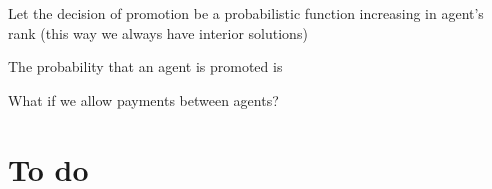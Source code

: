 \documentclass[11pt]{article}
\theoremstyle{quest}
\begin{document}


Let the decision of promotion be a probabilistic function increasing in agent's rank (this way we always have interior solutions)

The probability that an agent is promoted is 

What if we allow payments between agents?



\section{To do}
\end{document}
